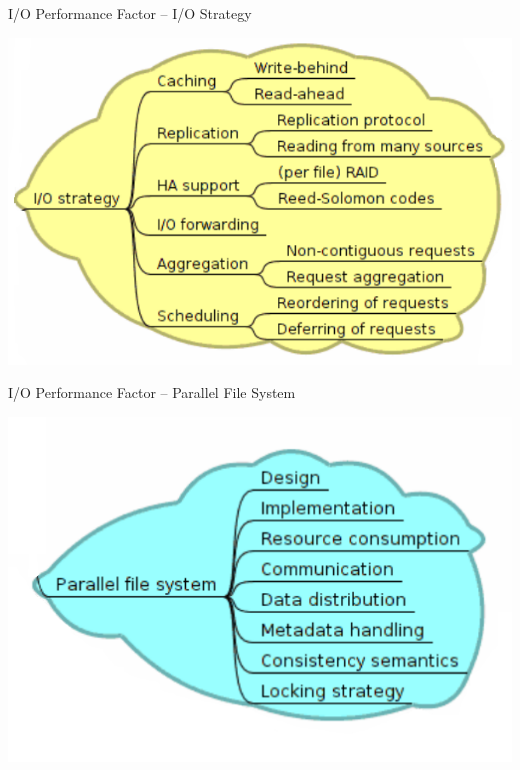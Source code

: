 \documentclass[compress,11pt,xcolor=svgnames,aspectratio=169]{beamer}
\begin{document}
\begin{frame}[t]{I/O Performance Factor -- I/O Strategy}

\begin{center}
\includegraphics[scale=0.6]{fig/tree-io-strat}
\end{center}

\nocite{SOPPOAASLK13}

\end{frame}

\begin{frame}[t]{I/O Performance Factor -- Parallel File System}

\begin{center}
\includegraphics[scale=0.6]{fig/tree-io-pfs}
\end{center}

\nocite{SOPPOAASLK13}

\end{frame}
\end{document}
